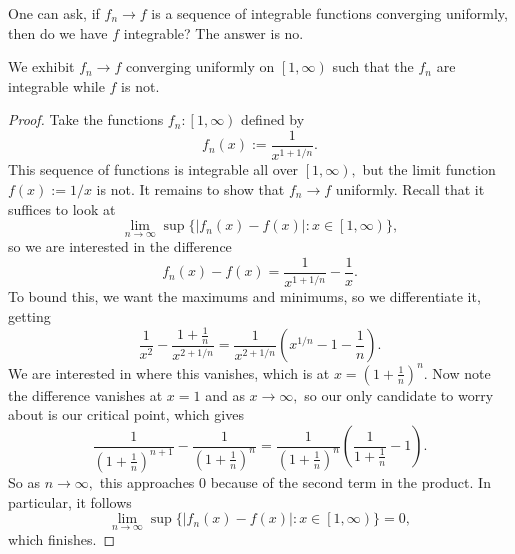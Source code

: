 \documentclass[../notes.tex]{subfiles}
\begin{document}
One can ask, if $f_n\to f$ is a sequence of integrable functions converging uniformly, then do we have $f$ integrable? The answer is no.
\begin{exercise}
	We exhibit $f_n\to f$ converging uniformly on $\left[1,\infty\right)$ such that the $f_n$ are integrable while $f$ is not.
\end{exercise}
\begin{proof}
	Take the functions $f_n:\left[1,\infty\right)$ defined by
	\[f_n(x):=\frac1{x^{1+1/n}}.\]
	This sequence of functions is integrable all over $\left[1,\infty\right),$ but the limit function $f(x):=1/x$ is not. It remains to show that $f_n\to f$ uniformly. Recall that it suffices to look at
	\[\lim_{n\to\infty}\sup\{|f_n(x)-f(x)|:x\in\left[1,\infty\right)\},\]
	so we are interested in the difference
	\[f_n(x)-f(x)=\frac1{x^{1+1/n}}-\frac1x.\]
	To bound this, we want the maximums and minimums, so we differentiate it, getting
	\[\frac1{x^2}-\frac{1+\frac1n}{x^{2+1/n}}=\frac1{x^{2+1/n}}\left(x^{1/n}-1-\frac1n\right).\]
	We are interested in where this vanishes, which is at $x=\left(1+\frac1n\right)^n.$ Now note the difference vanishes at $x=1$ and as $x\to\infty,$ so our only candidate to worry about is our critical point, which gives
	\[\frac1{\left(1+\frac1n\right)^{n+1}}-\frac1{\left(1+\frac1n\right)^n}=\frac1{\left(1+\frac1n\right)^n}\left(\frac1{1+\frac1n}-1\right).\]
	So as $n\to\infty,$ this approaches $0$ because of the second term in the product. In particular, it follows
	\[\lim_{n\to\infty}\sup\{|f_n(x)-f(x)|:x\in\left[1,\infty\right)\}=0,\]
	which finishes.
\end{proof}
\end{document}
